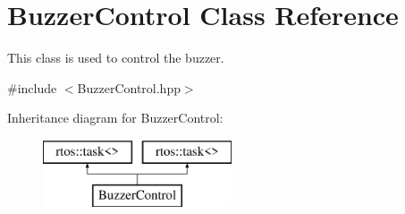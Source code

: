 \hypertarget{class_buzzer_control}{}\section{Buzzer\+Control Class Reference}
\label{class_buzzer_control}


This class is used to control the buzzer.  




{\ttfamily \#include $<$Buzzer\+Control.\+hpp$>$}

Inheritance diagram for Buzzer\+Control\+:\begin{figure}[H]
\begin{center}
\leavevmode
\includegraphics[height=2.000000cm]{class_buzzer_control}
\end{center}
\end{figure}
